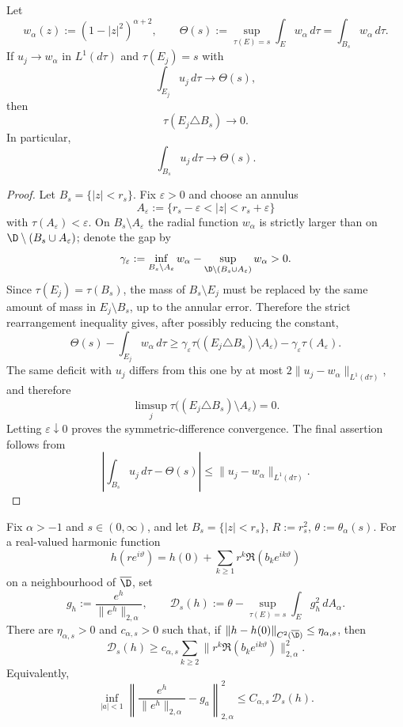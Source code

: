 \begin{numlemma}\label{lem:bathtub-compactness-radial}
Let
\[
w_\alpha(z):=(1-|z|^2)^{\alpha+2},
\qquad
\Theta(s):=\sup_{\tau(E)=s}\int_E w_\alpha\,d\tau
=\int_{B_s}w_\alpha\,d\tau .
\]
If $u_j\to w_\alpha$ in $L^1(d\tau)$ and $\tau(E_j)=s$ with
\[
\int_{E_j}u_j\,d\tau\longrightarrow \Theta(s),
\]
then
\[
\tau(E_j\triangle B_s)\longrightarrow0.
\]
In particular,
\[
\int_{B_s}u_j\,d\tau\longrightarrow\Theta(s).
\]
\end{numlemma}

\begin{proof}
Let $B_s=\{|z|<r_s\}$. Fix $\varepsilon>0$ and choose an annulus
\[
A_\varepsilon:=\{r_s-\varepsilon<|z|<r_s+\varepsilon\}
\]
with $\tau(A_\varepsilon)<\varepsilon$. On
$B_s\setminus A_\varepsilon$ the radial function $w_\alpha$ is strictly larger
than on $\D\setminus(B_s\cup A_\varepsilon)$; denote the gap by
\[
\gamma_\varepsilon
:=
\inf_{B_s\setminus A_\varepsilon}w_\alpha
-
\sup_{\D\setminus(B_s\cup A_\varepsilon)}w_\alpha
>0.
\]
Since $\tau(E_j)=\tau(B_s)$, the mass of $B_s\setminus E_j$ must be replaced
by the same amount of mass in $E_j\setminus B_s$, up to the annular error.
Therefore the strict rearrangement inequality gives, after possibly reducing
the constant,
\[
\Theta(s)-\int_{E_j}w_\alpha\,d\tau
\ge
\gamma_\varepsilon
\tau\bigl((E_j\triangle B_s)\setminus A_\varepsilon\bigr)
-\gamma_\varepsilon\tau(A_\varepsilon).
\]
The same deficit with $u_j$ differs from this one by at most
$2\|u_j-w_\alpha\|_{L^1(d\tau)}$, and therefore
\[
\limsup_j
\tau\bigl((E_j\triangle B_s)\setminus A_\varepsilon\bigr)=0.
\]
Letting $\varepsilon\downarrow0$ proves the symmetric-difference convergence.
The final assertion follows from
\[
\left|\int_{B_s}u_j\,d\tau-\Theta(s)\right|
\le \|u_j-w_\alpha\|_{L^1(d\tau)}.
\]
\end{proof}

\begin{numlemma}\label{lem:harmonic-bathtub-schur}
Fix $\alpha>-1$ and $s\in(0,\infty)$, and let
$B_s=\{|z|<r_s\}$, $R:=r_s^2$, $\theta:=\theta_\alpha(s)$. For a real-valued
harmonic function
\[
h(re^{i\vartheta})
=h(0)+\sum_{k\ge1} r^k
\Re(b_k e^{ik\vartheta})
\]
on a neighbourhood of $\overline\D$, set
\[
g_h:=\frac{e^h}{\|e^h\|_{2,\alpha}},
\qquad
\mathcal D_s(h):=
\theta-\sup_{\tau(E)=s}\int_E g_h^2\,dA_\alpha .
\]
There are $\eta_{\alpha,s}>0$ and $c_{\alpha,s}>0$ such that, if
$\|h-h(0)\|_{C^2(\overline\D)}\le\eta_{\alpha,s}$, then
\[
\mathcal D_s(h)
\ge
c_{\alpha,s}\sum_{k\ge2}\|r^k\Re(b_k e^{ik\vartheta})\|_{2,\alpha}^2 .
\]
Equivalently,
\[
\inf_{|a|<1}
\left\|
\frac{e^h}{\|e^h\|_{2,\alpha}}-g_a
\right\|_{2,\alpha}^2
\le
C_{\alpha,s}\,\mathcal D_s(h).
\]
\end{numlemma}

